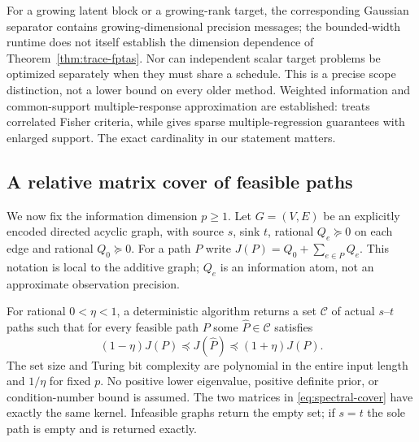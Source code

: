 For a growing latent block or a growing-rank target, the corresponding
Gaussian separator contains growing-dimensional precision messages; the
bounded-width runtime does not itself establish the dimension dependence of
Theorem~\ref{thm:trace-fptas}. Nor can independent scalar target problems
be optimized separately when they must share a schedule. This is a precise
scope distinction, not a lower bound on every older method. Weighted
information and common-support multiple-response approximation are established:
\citet{Liu2016} treats correlated Fisher criteria, while
\citet[Section 5]{Liberty2017} gives sparse multiple-regression guarantees
with enlarged support. The exact cardinality in our statement matters.

\subsection{A relative matrix cover of feasible paths}
\label{subsec:spectral-set}
We now fix the information dimension $p\ge1$. Let $G=(V,E)$ be an explicitly
encoded directed acyclic graph, with source $s$, sink $t$, rational
$Q_e\succeq0$ on each edge and rational $Q_0\succeq0$. For a path $P$ write
$J(P)=Q_0+\sum_{e\in P}Q_e$. This notation is local to the additive graph;
$Q_e$ is an information atom, not an approximate observation precision.

\begin{theorem}
\label{thm:dag-spectral-set}
For rational $0<\eta<1$, a deterministic algorithm returns a set $\mathcal C$
of actual $s$--$t$ paths such that for every feasible path $P$ some
$\widehat P\in\mathcal C$ satisfies
\begin{equation}
 (1-\eta)J(P)\preceq J(\widehat P)\preceq(1+\eta)J(P).
 \label{eq:spectral-cover}
\end{equation}
The set size and Turing bit complexity are polynomial in the entire input
length and $1/\eta$ for fixed $p$. No positive lower eigenvalue, positive
definite prior, or condition-number bound is assumed. The two matrices in
\eqref{eq:spectral-cover} have exactly the same kernel. Infeasible graphs
return the empty set; if $s=t$ the sole path is empty and is returned exactly.
\end{theorem}

